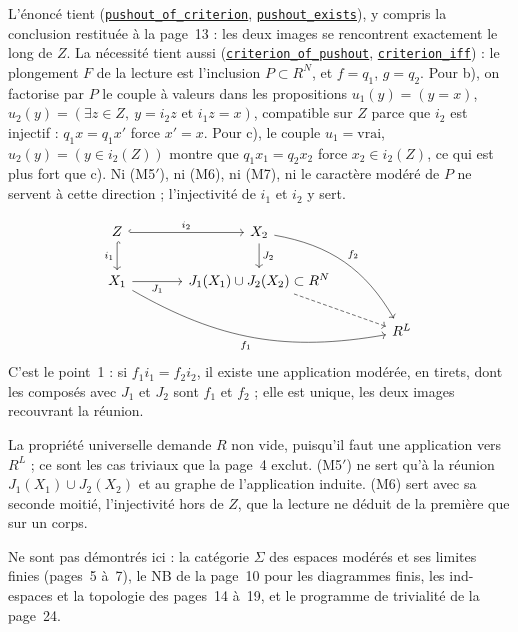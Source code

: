 \noindent L'énoncé tient (\href{\leanblob/Topology/Folder120.lean}{\texttt{pushout\_of\_criterion}}, \href{\leanblob/Topology/Folder120.lean}{\texttt{pushout\_exists}}), y compris la conclusion restituée à la page~13 : les deux images se rencontrent exactement le long de $Z$. La nécessité tient aussi (\href{\leanblob/Topology/Folder120.lean}{\texttt{criterion\_of\_pushout}}, \href{\leanblob/Topology/Folder120.lean}{\texttt{criterion\_iff}}) : le plongement $F$ de la lecture est l'inclusion $P \subset R^N$, et $f = q_1$, $g = q_2$. Pour b), on factorise par $P$ le couple à valeurs dans les propositions $u_1(y) = (y = x)$, $u_2(y) = (\exists z \in Z,\ y = i_2 z \text{ et } i_1 z = x)$, compatible sur $Z$ parce que $i_2$ est injectif : $q_1 x = q_1 x'$ force $x' = x$. Pour c), le couple $u_1 = \mathrm{vrai}$, $u_2(y) = (y \in i_2(Z))$ montre que $q_1 x_1 = q_2 x_2$ force $x_2 \in i_2(Z)$, ce qui est plus fort que c). Ni (M5$'$), ni (M6), ni (M7), ni le caractère modéré de $P$ ne servent à cette direction ; l'injectivité de $i_1$ et $i_2$ y sert.

\[
\begin{tikzcd}[column sep=large]
Z \arrow[r, hook, "i_2"] \arrow[d, hook, "i_1"'] & X_2 \arrow[d, "J_2"] \arrow[ddr, bend left=25, "f_2"] & \\
X_1 \arrow[r, "J_1"'] \arrow[drr, bend right=20, "f_1"'] & J_1(X_1) \cup J_2(X_2) \subset R^N \arrow[dr, dashed] & \\
& & R^L
\end{tikzcd}
\]
C'est le point~1 : si $f_1 i_1 = f_2 i_2$, il existe une application modérée, en tirets, dont les composés avec $J_1$ et $J_2$ sont $f_1$ et $f_2$ ; elle est unique, les deux images recouvrant la réunion.

\begin{remarque}
La propriété universelle demande $R$ non vide, puisqu'il faut une application vers $R^L$ ; ce sont les cas triviaux que la page~4 exclut. (M5$'$) ne sert qu'à la réunion $J_1(X_1) \cup J_2(X_2)$ et au graphe de l'application induite. (M6) sert avec sa seconde moitié, l'injectivité hors de $Z$, que la lecture ne déduit de la première que sur un corps.
\end{remarque}

Ne sont pas démontrés ici : la catégorie $\Sigma$ des espaces modérés et ses limites finies (pages~5 à~7), le NB de la page~10 pour les diagrammes finis, les ind-espaces et la topologie des pages~14 à~19, et le programme de trivialité de la page~24.
